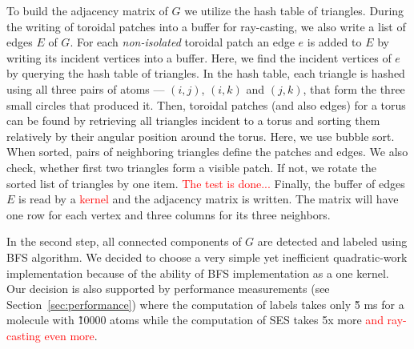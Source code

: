 To build the adjacency matrix of $G$ we utilize the hash table of triangles.
During the writing of toroidal patches into a buffer for ray-casting, we also write a list of edges $E$ of $G$.
For each \textit{non-isolated} toroidal patch an edge $e$ is added to $E$ by writing its incident vertices into a buffer.
Here, we find the incident vertices of $e$ by querying the hash table of triangles.
In the hash table, each triangle is hashed using all three pairs of atoms --- $(i, j)$, $(i, k)$ and $(j, k)$, that form the three small circles that produced it.
Then, toroidal patches (and also edges) for a torus can be found by retrieving all triangles incident to a torus and sorting them relatively by their angular position around the torus.
Here, we use bubble sort.
When sorted, pairs of neighboring triangles define the patches and edges.
We also check, whether first two triangles form a visible patch.
If not, we rotate the sorted list of triangles by one item.
\textcolor{red}{The test is done...}
Finally, the buffer of edges $E$ is read by a \textcolor{red}{kernel} and the adjacency matrix is written. 
The matrix will have one row for each vertex and three columns for its three neighbors.%

In the second step, all connected components of $G$ are detected and labeled using BFS algorithm.
We decided to choose a very simple yet inefficient \cite{merrill2012scalable} quadratic-work implementation because of the ability of BFS implementation as a one kernel.
Our decision is also supported by performance measurements (see Section~\ref{sec:performance}) where the computation of labels takes only \~5 ms for a molecule with \~10000 atoms while the computation of SES takes 5x more \textcolor{red}{and ray-casting even more}.

